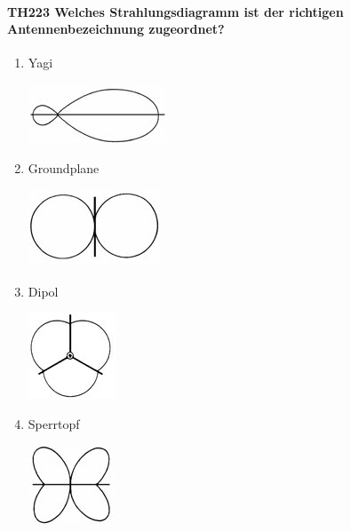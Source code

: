 \documentclass[8pt]{article}
\begin{document}
\paragraph*{TH223 Welches Strahlungsdiagramm ist der richtigen Antennenbezeichnung zugeordnet?}
\begin{enumerate}[nolistsep,label=\Alph*]
\item Yagi
\begin{center}
	\begin{minipage}{\linewidth}
		\centering
		\includegraphics[scale=1.0]{pics/th223_a.jpg}
	\end{minipage}
\end{center}
\item Groundplane
\begin{center}
	\begin{minipage}{\linewidth}
		\centering
		\includegraphics[scale=1.0]{pics/th223_b.jpg}
	\end{minipage}
\end{center}
\item Dipol
\begin{center}
	\begin{minipage}{\linewidth}
		\centering
		\includegraphics[scale=1.0]{pics/th223_c.jpg}
	\end{minipage}
\end{center}
\item Sperrtopf
\begin{center}
	\begin{minipage}{\linewidth}
		\centering
		\includegraphics[scale=1.0]{pics/th223_d.jpg}
	\end{minipage}
\end{center}
\end{enumerate}
\end{document}
